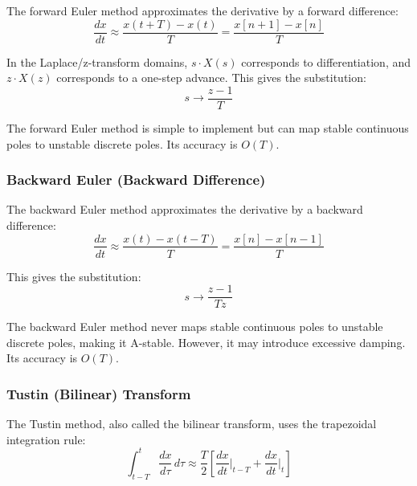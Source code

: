 The forward Euler method approximates the derivative by a forward difference:
\begin{equation}
\frac{dx}{dt} \approx \frac{x(t + T) - x(t)}{T} = \frac{x[n+1] - x[n]}{T}
\label{eq:forward_euler}
\end{equation}

In the Laplace/z-transform domains, $s \cdot X(s)$ corresponds to differentiation, and $z \cdot X(z)$ corresponds to a one-step advance. This gives the substitution:
\begin{equation}
\boxed{s \rightarrow \frac{z - 1}{T}}
\label{eq:forward_euler_substitution}
\end{equation}

The forward Euler method is simple to implement but can map stable continuous poles to unstable discrete poles. Its accuracy is $O(T)$.

\subsubsection{Backward Euler (Backward Difference)}

The backward Euler method approximates the derivative by a backward difference:
\begin{equation}
\frac{dx}{dt} \approx \frac{x(t) - x(t - T)}{T} = \frac{x[n] - x[n-1]}{T}
\label{eq:backward_euler}
\end{equation}

This gives the substitution:
\begin{equation}
\boxed{s \rightarrow \frac{z - 1}{Tz}}
\label{eq:backward_euler_substitution}
\end{equation}

The backward Euler method never maps stable continuous poles to unstable discrete poles, making it A-stable. However, it may introduce excessive damping. Its accuracy is $O(T)$.

\subsubsection{Tustin (Bilinear) Transform}

The Tustin method, also called the bilinear transform, uses the trapezoidal integration rule:
\begin{equation}
\int_{t-T}^{t} \frac{dx}{d\tau} \, d\tau \approx \frac{T}{2} \left[ \frac{dx}{dt}\bigg|_{t-T} + \frac{dx}{dt}\bigg|_t \right]
\label{eq:trapezoidal}
\end{equation}

